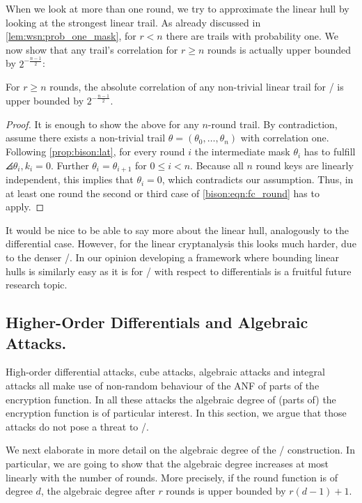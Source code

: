 When we look at more than one round, we try to approximate the linear hull by looking at the strongest linear trail.
As already discussed in \cref{lem:wsn:prob_one_mask}, for $r < n$ there are trails with probability one.
We now show that any trail's correlation for $r \geqslant n$ rounds is actually upper bounded by $2^{-\frac{n-1}{2}}$:
\begin{proposition}\label{prop:bison:lc_long}
    For $r \geqslant n$ rounds, the absolute correlation of any non-trivial linear trail for \bison/ is upper bounded by $2^{-\frac{n-1}{2}}$.
\end{proposition}
\begin{proof}
    It is enough to show the above for any $n$-round trail.
    By contradiction, assume there exists a non-trivial trail $\theta = (\theta_0, \ldots, \theta_n)$ with correlation one.
    Following \cref{prop:bison:lat}, for every round $i$ the intermediate mask $\theta_i$ has to fulfill $\angles{\theta_i, k_i} = 0$.
    Further $\theta_i = \theta_{i+1}$ for $0 \leqslant i < n$.
    Because all $n$ round keys are linearly independent, this implies that $\theta_i = 0$, which contradicts our assumption.
    Thus, in at least one round the second or third case of \cref{bison:eqn:fc_round} has to apply.
\end{proof}
It would be nice to be able to say more about the linear hull, analogously to the differential case.
However, for the linear cryptanalysis this looks much harder, due to the denser \LAT/.
In our opinion developing a framework where bounding linear hulls is similarly easy as it is for \bison/ with respect to differentials is a fruitful future research topic.

\subsection{Higher-Order Differentials and Algebraic Attacks.}
High-order differential attacks, cube attacks, algebraic attacks and integral attacks all make use of non-random behaviour of the ANF of parts of the encryption function.
In all these attacks the algebraic degree of (parts of) the encryption function is of particular interest.
In this section, we argue that those attacks do not pose a threat to \bison/.

We next elaborate in more detail on the algebraic degree of the \WSN/ construction.
In particular, we are going to show that the algebraic degree increases at most linearly with the number of rounds.
More precisely, if the round function is of degree $d$, the algebraic degree after $r$ rounds is upper bounded by $r(d-1)+1$.

